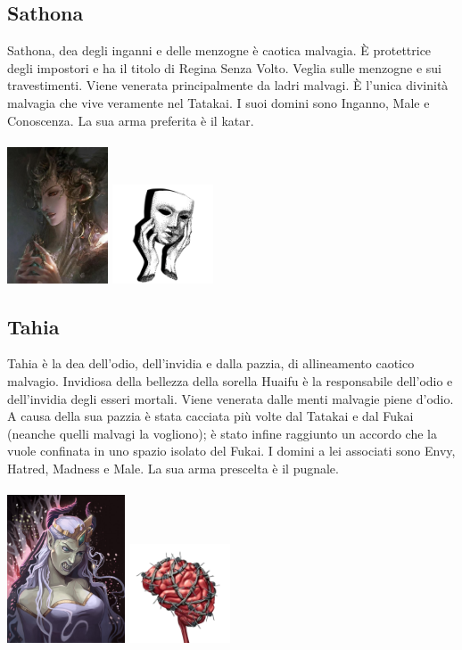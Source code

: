 \documentclass[10pt, a4paper]{report}
\begin{document}
\begin{multicols}{2}
\subsection*{Sathona}
Sathona, dea degli inganni e delle menzogne è caotica malvagia. È protettrice degli impostori e ha il titolo di Regina Senza Volto. Veglia sulle menzogne e sui travestimenti. Viene venerata principalmente da ladri malvagi. È l'unica divinità malvagia che vive veramente nel Tatakai. I suoi domini sono Inganno, Male e Conoscenza. La sua arma preferita è il katar.\\
\\
\includegraphics[width=3cm]{sathona.jpeg}
\includegraphics[width=3cm]{sathona_simbolo.png}
\subsection*{Tahia}
Tahia è la dea dell'odio, dell'invidia e dalla pazzia, di allineamento caotico malvagio. Invidiosa della bellezza della sorella Huaifu è la responsabile dell'odio e dell'invidia degli esseri mortali. Viene venerata dalle menti malvagie piene d'odio. A causa della sua pazzia è stata cacciata più volte dal Tatakai e dal Fukai (neanche quelli malvagi la vogliono); è stato infine raggiunto un accordo che la vuole confinata in uno spazio isolato del Fukai. I domini a lei associati sono Envy, Hatred, Madness e Male.
La sua arma prescelta è il pugnale.\\
\\
\includegraphics[width=3.5cm]{tahia.jpg}
\includegraphics[width=3cm]{tahia_simbolo.png}

\end{multicols}
\end{document}
